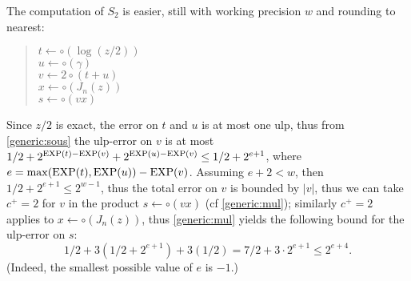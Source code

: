 \documentclass[12pt]{amsart}
\def\Exp{{\rm EXP}}
\begin{document}
The computation of $S_2$ is easier, still with working precision $w$ and
rounding to nearest:
\begin{quote}
$t \leftarrow \circ(\log(z/2))$ \\
$u \leftarrow \circ(\gamma)$ \\
$v \leftarrow 2 \circ(t + u)$  \\
$x \leftarrow \circ(J_n(z))$ \\
$s \leftarrow \circ(v x)$
\end{quote}
Since $z/2$ is exact, the error on $t$ and $u$ is at most one ulp,
thus from \textsection\ref{generic:sous} the ulp-error on $v$ is at most
$1/2 + 2^{\Exp(t)-\Exp(v)} + 2^{\Exp(u)-\Exp(v)} \leq 1/2 + 2^{e+1}$, where
$e = {\rm max}(\Exp(t), \Exp(u)) - \Exp(v)$. Assuming $e+2 < w$, then
$1/2 + 2^{e+1} \leq 2^{w-1}$, thus the total error on $v$ is bounded by $|v|$,
thus we can take $c^+ = 2$ for $v$ in the product $s \leftarrow \circ(v x)$
(cf \textsection\ref{generic:mul}); similarly $c^+ = 2$ applies to
$x \leftarrow \circ(J_n(z))$, thus \textsection\ref{generic:mul} yields the
following bound for the ulp-error on $s$:
\[ 1/2 + 3 (1/2 + 2^{e+1}) + 3 (1/2) = 7/2 + 3 \cdot 2^{e+1} \leq 2^{e+4}. \]
(Indeed, the smallest possible value of $e$ is $-1$.)
\end{document}
